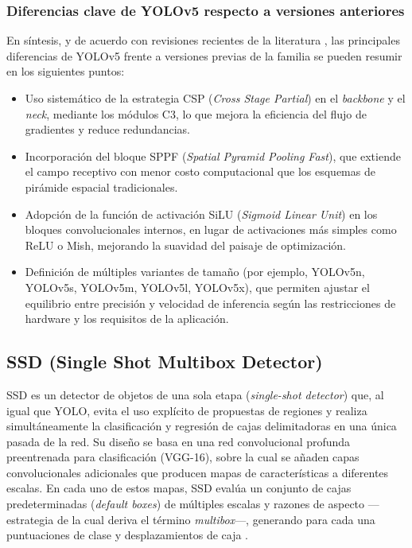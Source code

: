 \subsubsection{Diferencias clave de YOLOv5 respecto a versiones anteriores}

\par En síntesis, y de acuerdo con revisiones recientes de la literatura \cite{Jani2023ModelCompressionYOLOv5}, las principales diferencias de YOLOv5 frente a versiones previas de la familia se pueden resumir en los siguientes puntos:

\begin{itemize}
    \item Uso sistemático de la estrategia CSP (\textit{Cross Stage Partial}) en el \textit{backbone} y el \textit{neck}, mediante los módulos C3, lo que mejora la eficiencia del flujo de gradientes y reduce redundancias.
    \item Incorporación del bloque SPPF (\textit{Spatial Pyramid Pooling Fast}), que extiende el campo receptivo con menor costo computacional que los esquemas de pirámide espacial tradicionales.
    \item Adopción de la función de activación SiLU (\textit{Sigmoid Linear Unit}) en los bloques convolucionales internos, en lugar de activaciones más simples como ReLU o Mish, mejorando la suavidad del paisaje de optimización.
    \item Definición de múltiples variantes de tamaño (por ejemplo, YOLOv5n, YOLOv5s, YOLOv5m, YOLOv5l, YOLOv5x), que permiten ajustar el equilibrio entre precisión y velocidad de inferencia según las restricciones de hardware y los requisitos de la aplicación.
\end{itemize}



\subsection{SSD (Single Shot Multibox Detector)}
\label{subsec:ssd}

SSD es un detector de objetos de una sola etapa (\textit{single-shot detector}) que, al igual que YOLO, evita el uso explícito de propuestas de regiones y realiza simultáneamente la clasificación y regresión de cajas delimitadoras en una única pasada de la red. Su diseño se basa en una red convolucional profunda preentrenada para clasificación (VGG-16), sobre la cual se añaden capas convolucionales adicionales que producen mapas de características a diferentes escalas. En cada uno de estos mapas, SSD evalúa un conjunto de cajas predeterminadas (\textit{default boxes}) de múltiples escalas y razones de aspecto —estrategia de la cual deriva el término \textit{multibox}—, generando para cada una puntuaciones de clase y desplazamientos de caja \cite{liu2016ssd}.\\

